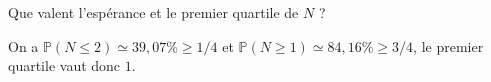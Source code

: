 {\begin{question}
Que valent l'espérance et le premier quartile de $N$ ?
\begin{answers}
\end{answers}
\begin{explanations}
On a $\mathbb{P}(N\leq 2) \simeq 39,07\% \geq 1/4$ et $\mathbb{P}(N\geq 1) \simeq  84,16\% \geq 3/4$, le premier quartile vaut donc $1$.
\end{explanations}
\end{question}
}
